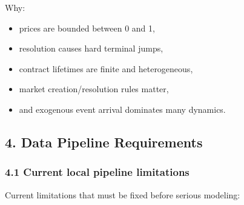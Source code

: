 \documentclass[
]{article}
\providecommand{\tightlist}{%
  \setlength{\itemsep}{0pt}\setlength{\parskip}{0pt}}
\begin{document}
Why:

\begin{itemize}
\tightlist
\item
  prices are bounded between 0 and 1,
\item
  resolution causes hard terminal jumps,
\item
  contract lifetimes are finite and heterogeneous,
\item
  market creation/resolution rules matter,
\item
  and exogenous event arrival dominates many dynamics.
\end{itemize}

\subsection{4. Data Pipeline
Requirements}\label{4-data-pipeline-requirements}

\subsubsection{4.1 Current local pipeline
limitations}\label{41-current-local-pipeline-limitations}

Current limitations that must be fixed before serious modeling:
\end{document}
